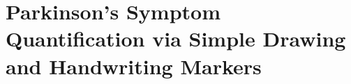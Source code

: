 \chapter{Parkinson's Symptom Quantification via Simple Drawing and Handwriting Markers}
\label{ch:handwriting}
\pagestyle{fancy}
\fancyhf{}
\fancyhead[OC]{\leftmark}
\fancyhead[EC]{\rightmark}
\cfoot{\thepage}


